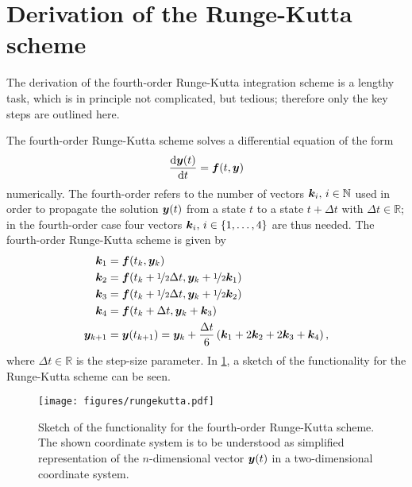 \documentclass[a4paper,11pt]{report}
\begin{document}
\section{Derivation of the Runge-Kutta scheme}\label{sec:derivrungekutta}
The derivation of the fourth-order Runge-Kutta integration scheme is a lengthy task, which is in principle not complicated, but tedious; therefore only the key steps are outlined here.

The fourth-order Runge-Kutta scheme solves a differential equation of the form \begin{equation}
\frac{\mathrm{d}\bm{y}(t)}{\mathrm{d}t} = \bm{f}(t,\bm{y})
\end{equation} numerically. The fourth-order refers to the number of vectors $\bm{k}_i,\,i\in\mathbb{N}$ used in order to propagate the solution $\bm{y}(t)$ from a state $t$ to a state $t+\Delta t$ with $\Delta t\in\mathbb{R}$; in the fourth-order case four vectors $\bm{k}_i,\,i\in\{1,\dots,4\}$ are thus needed. The fourth-order Runge-Kutta scheme is given by \begin{align}
\begin{aligned}
\bm{k}_1 &= \bm{f}(t_k,\bm{y}_k) \\
\bm{k}_2 &= \bm{f}(t_k+\nicefrac{1}{2}\Delta t,\bm{y}_k+\nicefrac{1}{2}\bm{k}_1) \\
\bm{k}_3 &= \bm{f}(t_k + \nicefrac{1}{2}\Delta t,\bm{y}_k+\nicefrac{1}{2}\bm{k}_2) \\
\bm{k}_4 &= \bm{f}(t_k+\Delta t,\bm{y}_k+\bm{k}_3) \\
\bm{y}_{k+1} &= \bm{y}(t_{k+1}) = \bm{y}_k + \frac{\Delta t}{6}\left(\bm{k}_1 + 2\bm{k}_2 + 2\bm{k}_3 + \bm{k}_4\right),
\end{aligned}
\end{align}
where $\Delta t\in\mathbb{R}$ is the step-size parameter. In \cref{fig:rungekutta}, a sketch of the functionality for the Runge-Kutta scheme can be seen.

\begin{figure}[h]
\centering
\texttt{[image: figures/rungekutta.pdf]}
\caption{Sketch of the functionality for the fourth-order Runge-Kutta scheme. The shown coordinate system is to be understood as simplified representation of the $n$-dimensional vector $\bm{y}(t)$ in a two-dimensional coordinate system.}
\label{fig:rungekutta}
\end{figure}
\end{document}

